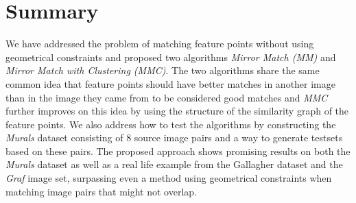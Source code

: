 \documentclass[conference]{IEEEtran}
\begin{document}
\section{Summary}
We have addressed the problem of matching feature points without using 
geometrical constraints and proposed two algorithms \emph{Mirror Match 
(MM)} and \emph{Mirror Match with Clustering (MMC)}. The two algorithms 
share the same common idea that feature points should have better 
matches in another image than in the image they came from to be 
considered good matches and \emph{MMC} further improves on this idea by 
using the structure of the similarity graph of the feature points. We 
also address how to test the algorithms by constructing the 
\emph{Murals} dataset consisting of $8$ source image pairs and a way to 
generate testsets based on these pairs.  The proposed approach shows 
promising results on both the \emph{Murals} dataset as well as a real 
life example from the Gallagher dataset and the \emph{Graf} image set, 
surpassing even a method using geometrical constraints when matching 
image pairs that might not overlap.
%


\end{document}
